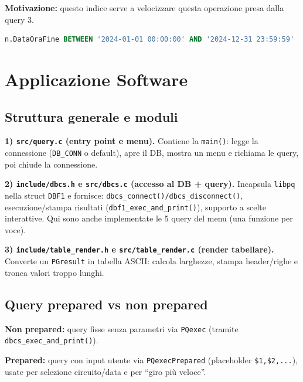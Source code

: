 \documentclass[11pt,a4paper]{article}
\begin{document}
\textbf{Motivazione:} questo indice serve a velocizzare questa operazione presa dalla query 3.

\begin{lstlisting}[language=SQL, caption={Operazione da velocizzare}]
n.DataOraFine BETWEEN '2024-01-01 00:00:00' AND '2024-12-31 23:59:59'
\end{lstlisting}

\section{Applicazione Software}

\subsection{Struttura generale e moduli}

\textbf{1) \texttt{src/query.c} (entry point e menu).}
Contiene la \texttt{main()}:
legge la connessione (\texttt{DB\_CONN} o default), apre il DB, mostra un menu e richiama le query, poi chiude la connessione.

\textbf{2) \texttt{include/dbcs.h} e \texttt{src/dbcs.c} (accesso al DB + query).}
Incapsula \texttt{libpq} nella struct \texttt{DBF1} e fornisce:
\texttt{dbcs\_connect()/dbcs\_disconnect()}, esecuzione/stampa risultati (\texttt{dbf1\_exec\_and\_print()}), supporto a scelte interattive.
Qui sono anche implementate le 5 query del menu (una funzione per voce).

\textbf{3) \texttt{include/table\_render.h} e \texttt{src/table\_render.c} (render tabellare).}
Converte un \texttt{PGresult} in tabella ASCII: calcola larghezze, stampa header/righe e tronca valori troppo lunghi.

\subsection{Query prepared vs non prepared}

\textbf{Non prepared:} query fisse senza parametri via \texttt{PQexec} (tramite \texttt{dbcs\_exec\_and\_print()}).

\textbf{Prepared:} query con input utente via \texttt{PQexecPrepared} (placeholder \texttt{\$1,\$2,...}), usate per selezione circuito/data e per “giro più veloce”.
\end{document}
